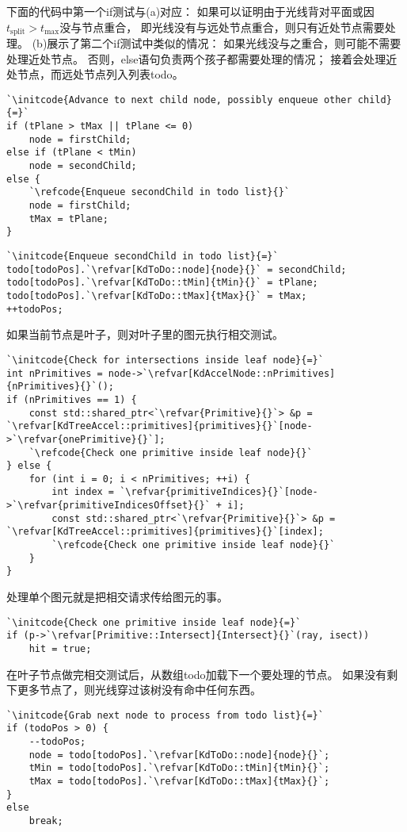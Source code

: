 下面的代码中第一个{\ttfamily if}测试与(a)对应：
如果可以证明由于光线背对平面或因$t_{\text{split}}>t_{\max}$没与节点重合，
即光线没有与远处节点重合，则只有近处节点需要处理。
(b)展示了第二个{\ttfamily if}测试中类似的情况：
如果光线没与之重合，则可能不需要处理近处节点。
否则，{\ttfamily else}语句负责两个孩子都需要处理的情况；
接着会处理近处节点，而远处节点列入列表{\ttfamily todo}。
\begin{lstlisting}
`\initcode{Advance to next child node, possibly enqueue other child}{=}`
if (tPlane > tMax || tPlane <= 0)
    node = firstChild;
else if (tPlane < tMin)
    node = secondChild;
else {
    `\refcode{Enqueue secondChild in todo list}{}`
    node = firstChild;
    tMax = tPlane;
}
\end{lstlisting}
\begin{lstlisting}
`\initcode{Enqueue secondChild in todo list}{=}`
todo[todoPos].`\refvar[KdToDo::node]{node}{}` = secondChild;
todo[todoPos].`\refvar[KdToDo::tMin]{tMin}{}` = tPlane;
todo[todoPos].`\refvar[KdToDo::tMax]{tMax}{}` = tMax;
++todoPos;
\end{lstlisting}

如果当前节点是叶子，则对叶子里的图元执行相交测试。
\begin{lstlisting}
`\initcode{Check for intersections inside leaf node}{=}`
int nPrimitives = node->`\refvar[KdAccelNode::nPrimitives]{nPrimitives}{}`();
if (nPrimitives == 1) {
    const std::shared_ptr<`\refvar{Primitive}{}`> &p = `\refvar[KdTreeAccel::primitives]{primitives}{}`[node->`\refvar{onePrimitive}{}`];
    `\refcode{Check one primitive inside leaf node}{}`
} else {
    for (int i = 0; i < nPrimitives; ++i) {
        int index = `\refvar{primitiveIndices}{}`[node->`\refvar{primitiveIndicesOffset}{}` + i];
        const std::shared_ptr<`\refvar{Primitive}{}`> &p = `\refvar[KdTreeAccel::primitives]{primitives}{}`[index];
        `\refcode{Check one primitive inside leaf node}{}`
    }
}
\end{lstlisting}

处理单个图元就是把相交请求传给图元的事。
\begin{lstlisting}
`\initcode{Check one primitive inside leaf node}{=}`
if (p->`\refvar[Primitive::Intersect]{Intersect}{}`(ray, isect))
    hit = true;
\end{lstlisting}

在叶子节点做完相交测试后，从数组{\ttfamily todo}加载下一个要处理的节点。
如果没有剩下更多节点了，则光线穿过该树没有命中任何东西。
\begin{lstlisting}
`\initcode{Grab next node to process from todo list}{=}`
if (todoPos > 0) {
    --todoPos;
    node = todo[todoPos].`\refvar[KdToDo::node]{node}{}`;
    tMin = todo[todoPos].`\refvar[KdToDo::tMin]{tMin}{}`;
    tMax = todo[todoPos].`\refvar[KdToDo::tMax]{tMax}{}`;
}
else
    break;
\end{lstlisting}

